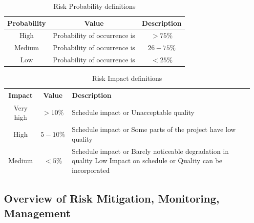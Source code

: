 \documentclass[oneside,a4paper,12pt]{book}
\begin{document}
\begin{table}[!htbp]
\begin{center}
\def\arraystretch{1.5}
\begin{tabular}{| c | c | c |}
\hline
Probability & Value &	Description \\ \hline
High &	Probability of occurrence is &  $ > 75 \% $ \\ \hline
Medium &	Probability of occurrence is  & $26-75 \% $ \\ \hline
Low	& Probability of occurrence is & $ < 25 \% $ \\ \hline
\end{tabular}
\end{center}
\caption{Risk Probability definitions \cite{bookPressman}}
\label{tab:riskdef}
\end{table}

\begin{table}[!htbp]
\begin{center}
\def\arraystretch{1.5}
\begin{tabularx}{\textwidth}{| c | c | X |}
\hline
Impact & Value	& Description \\ \hline
Very high &	$> 10 \%$ & Schedule impact or Unacceptable quality \\ \hline
High &	$5-10 \%$ & Schedule impact or Some parts of the project have low quality \\ \hline
Medium	& $ < 5 \% $ & Schedule impact or Barely noticeable degradation in quality Low	Impact on schedule or Quality can be incorporated \\ \hline
\end{tabularx}
\end{center}
\caption{Risk Impact definitions \cite{bookPressman}}
\label{tab:riskImpactDef}
\end{table}

\subsection{Overview of Risk Mitigation, Monitoring, Management}
\end{document}
